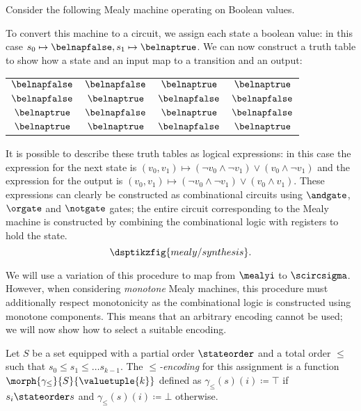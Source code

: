\begin{example}
    Consider the following Mealy machine operating on Boolean values.
    \begin{center}
        
    \end{center}
    To convert this machine to a circuit, we assign each state a boolean value:
    in this case \(s_0 \mapsto \belnapfalse, s_1 \mapsto \belnaptrue\).
    We can now construct a truth table to show how a state and an input map to
    a transition and an output:
    \begin{center}
        \begin{tabular}{cc|cc}
            \(\belnapfalse\) & \(\belnapfalse\) & \(\belnaptrue\)  & \(\belnaptrue\)  \\
            \(\belnapfalse\) & \(\belnaptrue\)  & \(\belnapfalse\) & \(\belnapfalse\) \\
            \(\belnaptrue\)  & \(\belnapfalse\) & \(\belnaptrue\)  & \(\belnapfalse\) \\
            \(\belnaptrue\)  & \(\belnaptrue\)  & \(\belnapfalse\) & \(\belnaptrue\)  \\
        \end{tabular}
    \end{center}
    It is possible to describe these truth tables as logical expressions: in
    this case the expression for the next state is \(
    (v_0, v_1)
    \mapsto
    (\neg v_0 \land \neg v_1) \lor (v_0 \land \neg v_1)
    \) and the expression for the output is \(
    (v_0, v_1)
    \mapsto
    (\neg v_0 \land \neg v_1) \lor (v_0 \land v_1)
    \).
    These expressions can clearly be constructed as combinational circuits using
    \(\andgate\), \(\orgate\) and \(\notgate\) gates; the entire circuit
    corresponding to the Mealy machine is constructed by combining the
    combinational logic with registers to hold the state.
    \[\dsptikzfig{mealy/synthesis}.\]
\end{example}

We will use a variation of this procedure to map from \(\mealyi\) to
\(\scircsigma\).
However, when considering \emph{monotone} Mealy machines, this procedure must
additionally respect monotonicity as the combinational logic is constructed
using monotone components.
This means that an arbitrary encoding cannot be used; we will now show how to
select a suitable encoding.

\begin{definition}[Encoding]\label{def:encoding}
    Let \(S\) be a set equipped with a partial order \(\stateorder\) and a total
    order \(\leq\) such that \(s_0 \leq s_1 \leq \dots s_{k-1}\).
    The \emph{\(\leq\)-encoding} for this assignment is a function
    \(\morph{\gamma_\leq}{S}{\valuetuple{k}}\) defined as
    \(\gamma_\leq(s)(i) \coloneqq \top\) if \(s_i \stateorder s\) and
    \(\gamma_\leq(s)(i) \coloneqq \bot\) otherwise.
\end{definition}

